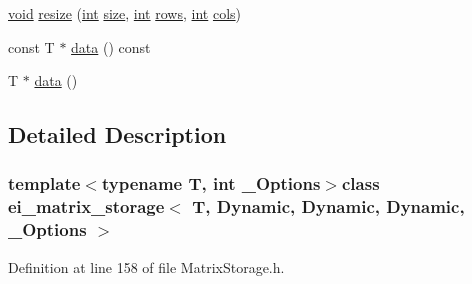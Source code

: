\begin{DoxyCompactItemize}
\item 
\hyperlink{group___u_a_v_objects_plugin_ga444cf2ff3f0ecbe028adce838d373f5c}{void} \hyperlink{classei__matrix__storage_3_01_t_00_01_dynamic_00_01_dynamic_00_01_dynamic_00_01___options_01_4_a302b3c34207943e6590300e788b47e28}{resize} (\hyperlink{ioapi_8h_a787fa3cf048117ba7123753c1e74fcd6}{int} \hyperlink{glext_8h_a014d89bd76f74ef3a29c8f04b473eb76}{size}, \hyperlink{ioapi_8h_a787fa3cf048117ba7123753c1e74fcd6}{int} \hyperlink{classei__matrix__storage_3_01_t_00_01_dynamic_00_01_dynamic_00_01_dynamic_00_01___options_01_4_a5598a127d0c1880fb319a1573032098c}{rows}, \hyperlink{ioapi_8h_a787fa3cf048117ba7123753c1e74fcd6}{int} \hyperlink{classei__matrix__storage_3_01_t_00_01_dynamic_00_01_dynamic_00_01_dynamic_00_01___options_01_4_a169032aa0198853877ab2644c6970161}{cols})
\item 
const T $\ast$ \hyperlink{classei__matrix__storage_3_01_t_00_01_dynamic_00_01_dynamic_00_01_dynamic_00_01___options_01_4_aa09914fcd2b88c2792402d539749e8d1}{data} () const 
\item 
T $\ast$ \hyperlink{classei__matrix__storage_3_01_t_00_01_dynamic_00_01_dynamic_00_01_dynamic_00_01___options_01_4_a0bb624207808de97aa3c59e37d6cc842}{data} ()
\end{DoxyCompactItemize}


\subsection{Detailed Description}
\subsubsection*{template$<$typename T, int \-\_\-\-Options$>$class ei\-\_\-matrix\-\_\-storage$<$ T, Dynamic, Dynamic, Dynamic, \-\_\-\-Options $>$}



Definition at line 158 of file Matrix\-Storage.\-h.



